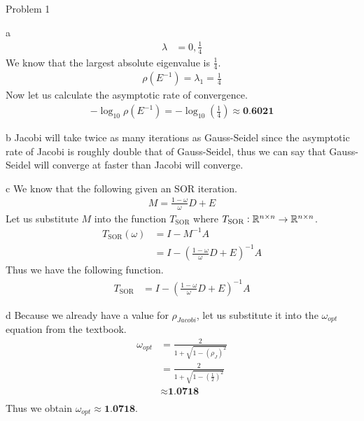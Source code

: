 \begin{section}{Problem 1}
\begin{solution}{a}
\begin{align*}
            \lambda &= 0, \frac{1}{4}
        \end{align*}
        We know that the largest absolute eigenvalue is $\frac{1}{4}$.
        \begin{align*}
            \rho \left( E^{-1} \right) = \lambda_1 = \frac{1}{4}
        \end{align*}
        Now let us calculate the asymptotic rate of convergence.
        \begin{align*}
            - \log_{10} \rho \left( E^{-1} \right) = - \log_{10} \left( \frac{1}{4} \right) \approx \textbf{0.6021}
        \end{align*}
    \end{solution}

    \newpage

    \begin{solution}{b}
        Jacobi will take twice as many iterations as Gauss-Seidel since the asymptotic rate of Jacobi is roughly double that of Gauss-Seidel, thus we can say that Gauss-Seidel will converge at faster than Jacobi will converge. 
    \end{solution}

    \newpage

    \begin{solution}{c}
        We know that the following given an SOR iteration.
        \begin{align*}
            M = \frac{1 - \omega}{\omega} D + E
        \end{align*}
        Let us substitute $M$ into the function $T_\text{SOR}$ where $T_\text{SOR} : \mathbb{R}^{n \times n} \rightarrow \mathbb{R}^{n \times n}$.
        \begin{align*}
            T_\text{SOR} (\omega) &= I - M^{-1} A \\
            &= I - \left( \frac{1 - \omega}{\omega} D + E \right)^{-1} A
        \end{align*}
        Thus we have the following function.
        \begin{align*}
            T_\text{SOR} &= I - \left( \frac{1 - \omega}{\omega} D + E \right)^{-1} A
        \end{align*}
    \end{solution}

    \newpage

    \begin{solution}{d}
        Because we already have a value for $\rho_{Jacobi}$, let us substitute it into the $\omega_{opt}$ equation from the textbook.
        \begin{align*}
            \omega_{opt} &= \frac{2}{1 + \sqrt{1 - \left( \rho_J \right)^2}} \\
            &= \frac{2}{1 + \sqrt{1 - \left( \frac{1}{2} \right)^2}} \\
            &\approx \textbf{1.0718} \\
        \end{align*}
        Thus we obtain $\omega_{opt} \approx \textbf{1.0718}$.
    \end{solution}


\end{section}
